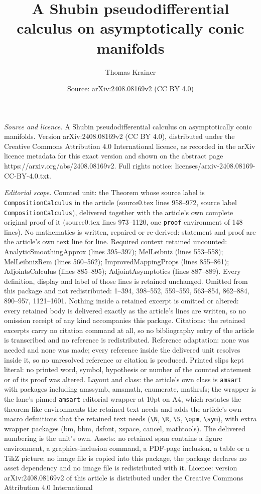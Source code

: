 \documentclass[10pt,a4paper]{amsart}
\title[A Shubin pseudodifferential calculus on asymptotically conic]{A Shubin pseudodifferential calculus on asymptotically conic manifolds}
\author{Thomas Krainer}
\date{Source: arXiv:2408.08169v2 (CC BY 4.0)}
\begin{document}
\maketitle

\noindent\emph{Source and licence.} A Shubin pseudodifferential calculus on asymptotically conic manifolds. Version arXiv:2408.08169v2 (CC BY 4.0), distributed under the Creative Commons Attribution 4.0 International licence, as recorded in the arXiv licence metadata for this exact version and shown on the abstract page https://arxiv.org/abs/2408.08169v2. Full rights notice: licenses/arxiv-2408.08169-CC-BY-4.0.txt.\par\smallskip

\noindent\textit{Editorial scope.} Counted unit: the Theorem whose source label is \texttt{CompositionCalculus} in the article (source0.tex lines 958--972, source label \texttt{CompositionCalculus}), delivered together with the article's own complete original proof of it (source0.tex lines 973--1120, one \texttt{proof} environment of 148 lines). No mathematics is written, repaired or re-derived: statement and proof are the article's own text line for line. Required context retained uncounted: AnalyticSmoothingApprox (lines 395--397); MelLeibniz (lines 553--558); MelLeibnizRem (lines 560--562); ImprovedMappingProps (lines 855--861); AdjointsCalculus (lines 885--895); AdjointAsymptotics (lines 887--889). Every definition, display and label of those lines is retained unchanged. Omitted from this package and not redistributed: 1--394, 398--552, 559--559, 563--854, 862--884, 890--957, 1121--1601. Nothing inside a retained excerpt is omitted or altered: every retained body is delivered exactly as the article's lines are written, so no omission receipt of any kind accompanies this package. Citations: the retained excerpts carry no citation command at all, so no bibliography entry of the article is transcribed and no reference is redistributed. Reference adaptation: none was needed and none was made; every reference inside the delivered unit resolves inside it, so no unresolved reference or citation is produced. Printed slips kept literal: no printed word, symbol, hypothesis or number of the counted statement or of its proof was altered. Layout and class: the article's own class is \texttt{amsart} with packages including amssymb, amsmath, enumerate, mathrsfs; the wrapper is the lane's pinned \texttt{amsart} editorial wrapper at 10pt on A4, which restates the theorem-like environments the retained text needs and adds the article's own macro definitions that the retained text needs (\texttt{\textbackslash N}, \texttt{\textbackslash R}, \texttt{\textbackslash S}, \texttt{\textbackslash opm}, \texttt{\textbackslash sym}), with extra wrapper packages (bm, bbm, dsfont, xspace, cancel, mathtools). The delivered numbering is the unit's own. Assets: no retained span contains a figure environment, a graphics-inclusion command, a PDF-page inclusion, a table or a TikZ picture; no image file is copied into this package, the package declares no asset dependency and no image file is redistributed with it. Licence: version arXiv:2408.08169v2 of this article is distributed under the Creative Commons Attribution 4.0 International 
\end{document}
